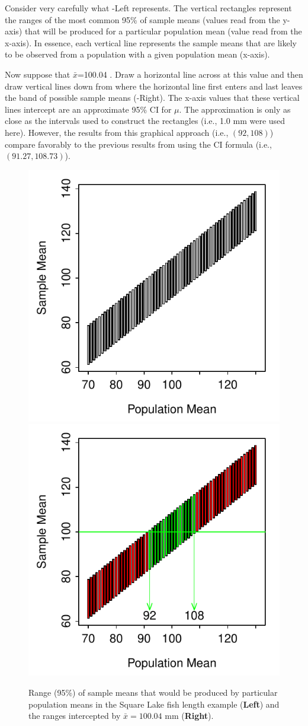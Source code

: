 \documentclass[10pt,openany]{book}\usepackage[]{graphicx}\usepackage[]{color}
\newenvironment{knitrout}{}{} %
\begin{document}
Consider very carefully what -Left represents. The vertical rectangles represent the ranges of the most common 95\% of sample means (values read from the y-axis) that will be produced for a particular population mean (value read from the x-axis). In essence, each vertical line represents the sample means that are likely to be observed from a population with a given population mean (x-axis).

Now suppose that $\bar{x}$=100.04 . Draw a horizontal line across  at this value and then draw vertical lines down from where the horizontal line first enters and last leaves the band of possible sample means (-Right). The x-axis values that these vertical lines intercept are an approximate 95\% CI for $\mu$. The approximation is only as close as the intervals used to construct the rectangles (i.e., 1.0 mm were used here). However, the results from this graphical approach (i.e., $(92,108)$) compare favorably to the previous results from using the CI formula (i.e., $(91.27,108.73)$).

\begin{knitrout}
\color{fgcolor}\begin{figure}[hbtp]

{\centering \includegraphics[width=.4\linewidth]{Figs/CIAlt1-1} 
\includegraphics[width=.4\linewidth]{Figs/CIAlt1-2} 

}

\caption{Range (95\%) of sample means that would be produced by particular population means in the Square Lake fish length example (\textbf{Left}) and the ranges intercepted by $\bar{x}=100.04$ mm (\textbf{Right}).}\label{fig:CIAlt1}
\end{figure}


\end{knitrout}
\end{document}
